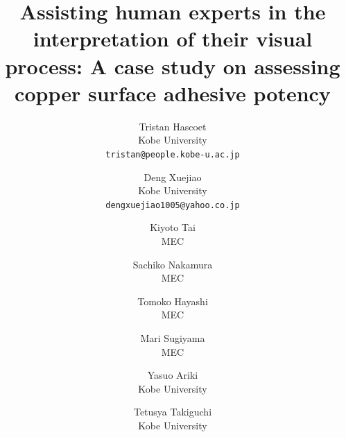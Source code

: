 \documentclass[10pt,twocolumn,letterpaper]{article}
\begin{document}
\title{Assisting human experts in the interpretation of their visual process: A case study on assessing copper surface adhesive potency}%

\author{
Tristan Hascoet\\
Kobe University\\
{\tt\small tristan@people.kobe-u.ac.jp}
\and
Deng Xuejiao\\
Kobe University\\
{\tt\small dengxuejiao1005@yahoo.co.jp}
\and
Kiyoto Tai\\
MEC\\
\and
Sachiko Nakamura\\
MEC\\
\and
Tomoko Hayashi\\
MEC\\
\and
Mari Sugiyama\\
MEC\\
\and
Yasuo Ariki\\
Kobe University\\
\and
Tetusya Takiguchi\\
Kobe University\\
}

\maketitle
\end{document}
